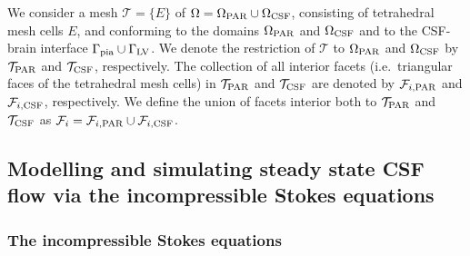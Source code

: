 \documentclass[fleqn,10pt]{wlscirep}
\begin{document}

We consider a mesh $\mathcal{T} = \{ E \}$ of $\Omega = \Omega_{\rm
  PAR} \cup \Omega_{\rm CSF}$, consisting of tetrahedral mesh cells
$E$, and conforming to the domains $\Omega_{\rm PAR}$ and $\Omega_{\rm
  CSF}$ and to the CSF-brain interface $\Gamma_{\rm pia} \cup
\Gamma_{\rm LV}$. We denote the restriction of $\mathcal{T}$ to
$\Omega_{\rm PAR}$ and $\Omega_{\rm CSF}$ by $\mathcal{T}_{\rm PAR}$
and $\mathcal{T}_{\rm CSF}$, respectively. The collection of all
interior facets (i.e.~triangular faces of the tetrahedral mesh cells)
in $\mathcal{T}_{\rm PAR}$ and $\mathcal{T}_{\rm CSF}$ are denoted by
$\mathcal{F}_{i, \rm PAR}$ and $\mathcal{F}_{i, \rm CSF}$,
respectively. We define the union of facets interior both to
$\mathcal{T}_{ \rm PAR}$ and $\mathcal{T}_{ \rm CSF}$ as
$\mathcal{F}_i = \mathcal{F}_{i, \rm PAR} \cup \mathcal{F}_{i, \rm
  CSF}$. 

\subsection{Modelling and simulating steady state CSF flow via the incompressible Stokes equations}
\label{sec:app:csf_flow}

\subsubsection{The incompressible Stokes equations}
\end{document}
